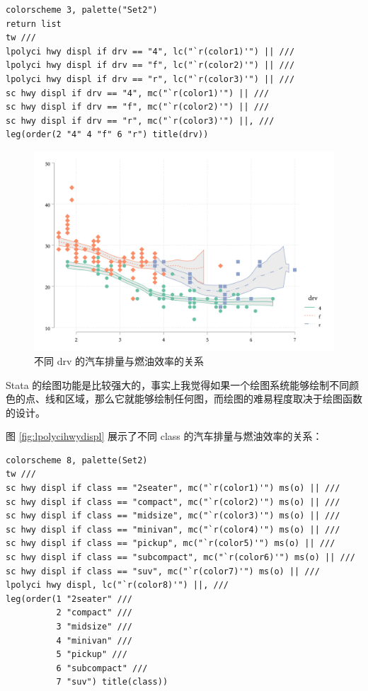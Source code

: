 \begin{lstlisting}
colorscheme 3, palette("Set2")
return list
tw ///
lpolyci hwy displ if drv == "4", lc("`r(color1)'") || ///
lpolyci hwy displ if drv == "f", lc("`r(color2)'") || ///
lpolyci hwy displ if drv == "r", lc("`r(color3)'") || ///
sc hwy displ if drv == "4", mc("`r(color1)'") || ///
sc hwy displ if drv == "f", mc("`r(color2)'") || ///
sc hwy displ if drv == "r", mc("`r(color3)'") ||, ///
leg(order(2 "4" 4 "f" 6 "r") title(drv))
\end{lstlisting}

\begin{figure}[htbp]
  \centering \includegraphics[width=\textwidth]{assets/lpolycibydrv2.png}
  \caption{不同 drv 的汽车排量与燃油效率的关系}
  \label{fig:lpolycibydrv2}
\end{figure}

Stata 的绘图功能是比较强大的，事实上我觉得如果一个绘图系统能够绘制不同颜色的点、线和区域，那么它就能够绘制任何图，而绘图的难易程度取决于绘图函数的设计。

图 \ref{fig:lpolycihwydispl} 展示了不同 class 的汽车排量与燃油效率的关系：

\begin{lstlisting}
colorscheme 8, palette(Set2)
tw ///
sc hwy displ if class == "2seater", mc("`r(color1)'") ms(o) || ///
sc hwy displ if class == "compact", mc("`r(color2)'") ms(o) || ///
sc hwy displ if class == "midsize", mc("`r(color3)'") ms(o) || ///
sc hwy displ if class == "minivan", mc("`r(color4)'") ms(o) || ///
sc hwy displ if class == "pickup", mc("`r(color5)'") ms(o) || ///
sc hwy displ if class == "subcompact", mc("`r(color6)'") ms(o) || ///
sc hwy displ if class == "suv", mc("`r(color7)'") ms(o) || ///
lpolyci hwy displ, lc("`r(color8)'") ||, ///
leg(order(1 "2seater" ///
          2 "compact" ///
          3 "midsize" ///
          4 "minivan" ///
          5 "pickup" ///
          6 "subcompact" ///
          7 "suv") title(class))
\end{lstlisting}

